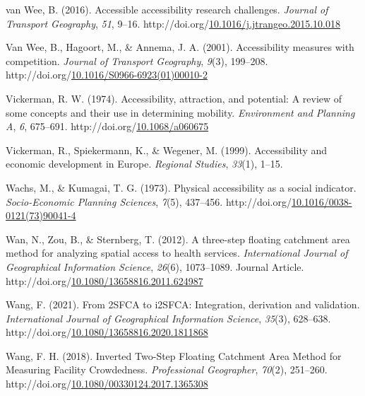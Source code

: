 \documentclass[
11pt, %
oneside, %
english, %
singlespacing, %
]{macthesis} %
\newlength{\cslhangindent}
\newenvironment{CSLReferences}[2] %
{\begin{list}{}{%
	\setlength{\itemindent}{0pt}
	\setlength{\leftmargin}{0pt}
	\setlength{\parsep}{0pt}
	\ifodd #1
	\setlength{\leftmargin}{\cslhangindent}
	\setlength{\itemindent}{-1\cslhangindent}
	\fi
	\setlength{\itemsep}{#2\baselineskip}}}
{\end{list}}
\begin{document}
\begin{CSLReferences}{1}{0}
van Wee, B. (2016). Accessible accessibility research challenges. \emph{Journal of Transport Geography}, \emph{51}, 9--16. http://doi.org/\href{https://doi.org/10.1016/j.jtrangeo.2015.10.018}{10.1016/j.jtrangeo.2015.10.018}

Van Wee, B., Hagoort, M., \& Annema, J. A. (2001). Accessibility measures with competition. \emph{Journal of Transport Geography}, \emph{9}(3), 199--208. http://doi.org/\href{https://doi.org/10.1016/S0966-6923(01)00010-2}{10.1016/S0966-6923(01)00010-2}

Vickerman, R. W. (1974). Accessibility, attraction, and potential: A review of some concepts and their use in determining mobility. \emph{Environment and Planning A}, \emph{6}, 675--691. http://doi.org/\href{https://doi.org/10.1068/a060675}{10.1068/a060675}

Vickerman, R., Spiekermann, K., \& Wegener, M. (1999). Accessibility and economic development in {Europe}. \emph{Regional Studies}, \emph{33}(1), 1--15.

Wachs, M., \& Kumagai, T. G. (1973). Physical accessibility as a social indicator. \emph{Socio-Economic Planning Sciences}, \emph{7}(5), 437--456. http://doi.org/\href{https://doi.org/10.1016/0038-0121(73)90041-4}{10.1016/0038-0121(73)90041-4}

Wan, N., Zou, B., \& Sternberg, T. (2012). A three-step floating catchment area method for analyzing spatial access to health services. \emph{International Journal of Geographical Information Science}, \emph{26}(6), 1073--1089. Journal Article. http://doi.org/\href{https://doi.org/10.1080/13658816.2011.624987}{10.1080/13658816.2011.624987}

Wang, F. (2021). From {2SFCA} to {i2SFCA}: Integration, derivation and validation. \emph{International Journal of Geographical Information Science}, \emph{35}(3), 628--638. http://doi.org/\href{https://doi.org/10.1080/13658816.2020.1811868}{10.1080/13658816.2020.1811868}

Wang, F. H. (2018). Inverted {Two}-{Step} {Floating} {Catchment} {Area} {Method} for {Measuring} {Facility} {Crowdedness}. \emph{Professional Geographer}, \emph{70}(2), 251--260. http://doi.org/\href{https://doi.org/10.1080/00330124.2017.1365308}{10.1080/00330124.2017.1365308}


\end{CSLReferences}
\end{document}
